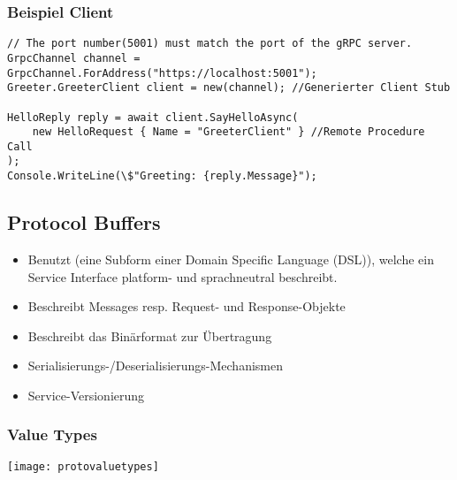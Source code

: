 \begin{multicols*}{2}
\subsubsection{Beispiel Client}
\begin{lstlisting}
// The port number(5001) must match the port of the gRPC server.
GrpcChannel channel = GrpcChannel.ForAddress("https://localhost:5001");
Greeter.GreeterClient client = new(channel); //Generierter Client Stub

HelloReply reply = await client.SayHelloAsync(
    new HelloRequest { Name = "GreeterClient" } //Remote Procedure Call
);
Console.WriteLine(\$"Greeting: {reply.Message}");
\end{lstlisting}

\subsection{Protocol Buffers}
\begin{itemize}
    \item Benutzt  (eine Subform einer Domain Specific Language (DSL)),
    welche ein Service Interface platform- und sprachneutral beschreibt.
    \item {} Beschreibt Messages resp. Request- und Response-Objekte
    \item {} Beschreibt das Binärformat zur Übertragung
    \item Serialisierungs-/Deserialisierungs-Mechanismen
    \item Service-Versionierung
\end{itemize}
\subsubsection{Value Types}
\texttt{[image: protovaluetypes]}

\end{multicols*}
